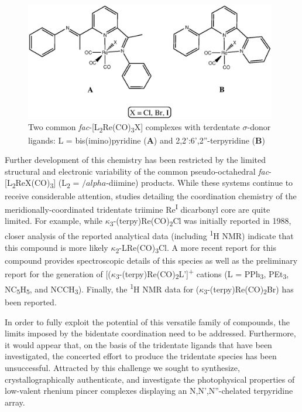 \begin{figure}[!htbp]
 \begin{center}
  \includegraphics[clip=true, width=110mm]{images/terdentateligands.eps}
 \end{center}
\caption[Two common bidentate complexes using terdentate ligands]{Two common \textit{fac}-[L\textsubscript{2}Re(CO)\textsubscript{3}X] complexes with terdentate $\sigma$-donor ligands: L = bis(imino)pyridine (\textbf{A}) and 2,2':6',2''-terpyridine (\textbf{B})}
\label{fig.terdentateligands}
\end{figure}

Further development of this chemistry has been restricted by the limited structural and electronic variability of the common pseudo-octahedral \textit{fac}-[L\textsubscript{2}ReX(CO)\textsubscript{3}] (L\textsubscript{2} = $/alpha$-diimine) products. While these systems continue to receive considerable attention, studies detailing the coordination chemistry of the meridionally-coordinated tridentate triimine Re\textsuperscript{I} dicarbonyl core are quite limited\autocite{jurca2013}. For example, while $\kappa$\textsubscript{3}-(terpy)Re(CO)\textsubscript{2}Cl was initially reported in 1988\autocite{juris1988}, closer analysis of the reported analytical data (including \textsuperscript{1}H NMR) indicate that this compound is more likely $\kappa$\textsubscript{2}-LRe(CO)\textsubscript{3}Cl. A more recent report for this compound provides spectroscopic details of this species as well as the preliminary report for the generation of [($\kappa$\textsubscript{3}-(terpy)Re(CO)\textsubscript{2}L’]\textsuperscript{+} cations (L = PPh\textsubscript{3}, PEt\textsubscript{3}, NC\textsubscript{5}H\textsubscript{5}, and NCCH\textsubscript{3})\autocite{black2012}. Finally, the \textsuperscript{1}H NMR data for ($\kappa$\textsubscript{3}-(terpy)Re(CO)\textsubscript{2}Br) has been reported\autocite{abel1993}.

In order to fully exploit the potential of this versatile family of compounds, the limits imposed by the bidentate coordination need to be addressed. Furthermore, it would appear that, on the basis of the tridentate ligands that have been investigated, the concerted effort to produce the tridentate species has been unsuccessful. Attracted by this challenge we sought to synthesize, crystallographically authenticate, and investigate the photophysical properties of low-valent rhenium pincer complexes displaying an N,N',N''-chelated terpyridine array. 

